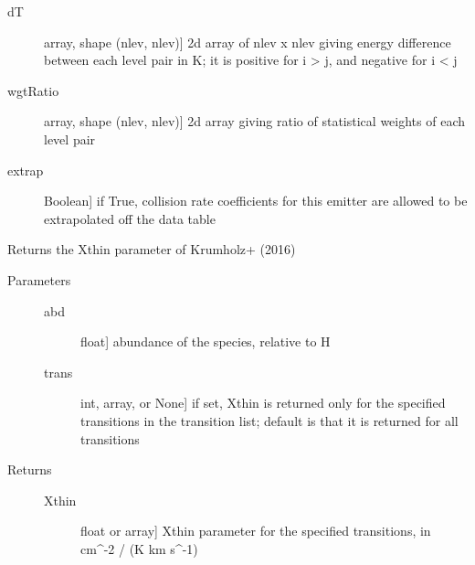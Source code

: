 \documentclass[letterpaper,10pt,english]{sphinxmanual}
\begin{document}
\begin{fulllineitems}
\begin{description}
\begin{description}
\item[{dT}] \leavevmode{[}array, shape (nlev, nlev){]}
2d array of nlev x nlev giving energy difference between each
level pair in K; it is positive for i \textgreater{} j, and negative for i
\textless{} j

\item[{wgtRatio}] \leavevmode{[}array, shape (nlev, nlev){]}
2d array giving ratio of statistical weights of each level
pair

\item[{extrap}] \leavevmode{[}Boolean{]}
if True, collision rate coefficients for this emitter are
allowed to be extrapolated off the data table

\end{description}

\end{description}

\begin{fulllineitems}
\label{fulldoc:despotic.emitterData.Xthin}
Returns the Xthin parameter of Krumholz+ (2016)
\begin{description}
\item[{Parameters}] \leavevmode\begin{description}
\item[{abd}] \leavevmode{[}float{]}
abundance of the species, relative to H

\item[{trans}] \leavevmode{[}int, array, or None{]}
if set, Xthin is returned only for the specified
transitions in the transition list; default is that it
is returned for all transitions

\end{description}

\item[{Returns}] \leavevmode\begin{description}
\item[{Xthin}] \leavevmode{[}float or array{]}
Xthin parameter for the specified transitions, in cm\textasciicircum{}-2
/ (K km s\textasciicircum{}-1)

\end{description}

\end{description}

\end{fulllineitems}



\end{fulllineitems}
\end{document}

